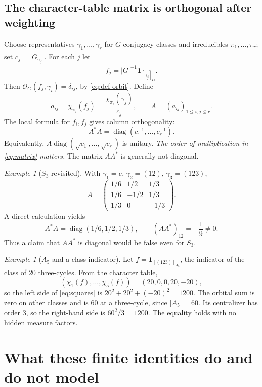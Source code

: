 \documentclass[12pt]{article}
\theoremstyle{remark}
\newtheorem{example}[theorem]{Example}
\newcommand{\Orb}{\mathcal O}
\newcommand{\diag}{\operatorname{diag}}
\begin{document}
\subsection{The character-table matrix is orthogonal after weighting}
Choose representatives $\gamma_1,\ldots,\gamma_r$ for
$G$-conjugacy classes and irreducibles
$\pi_1,\ldots,\pi_r$; set $c_j=|G_{\gamma_j}|$.  For each $j$ let
\begin{equation}\label{eq:basis-orb}
 f_j=|G|^{-1}\mathbf1_{[\gamma_j]_G}.
\end{equation}
Then $\Orb_G(f_j,\gamma_i)=\delta_{ij}$, by
\eqref{eq:def-orbit}. Define
\[
 a_{ij}=\chi_{\pi_i}(f_j)
 =\frac{\chi_{\pi_i}(\gamma_j)}{c_j},\qquad
 A=(a_{ij})_{1\leq i,j\leq r}.
\]
The local formula for $f_i,f_j$ gives column orthogonality:
\begin{equation}\label{eq:matrix}
 \boxed{\displaystyle
 A^*A=\diag(c_1^{-1},\ldots,c_r^{-1}).}
\end{equation}
Equivalently,
$A\diag(\sqrt{c_1},\ldots,\sqrt{c_r})$ is unitary.
\emph{The order of multiplication in \eqref{eq:matrix} matters.}
The matrix $AA^*$ is generally not diagonal.
\begin{example}[$S_3$ revisited]
With $\gamma_1=e$, $\gamma_2=(12)$, $\gamma_3=(123)$,
\[
 A=\begin{pmatrix}
 1/6&1/2&1/3\\
 1/6&-1/2&1/3\\
 1/3&0&-1/3
 \end{pmatrix}.
\]
A direct calculation yields
\[
 A^*A=\diag(1/6,1/2,1/3),\qquad
 (AA^*)_{12}=-\frac19\ne0.
\]
Thus a claim that $AA^*$ is diagonal would be false even for $S_3$.
\end{example}
\begin{example}[$A_5$ and a class indicator]\label{ex:A5}
Let $f=\mathbf1_{[(123)]_{A_5}}$, the indicator of the class of
$20$ three-cycles. From the character table,
\[
 (\chi_1(f),\ldots,\chi_5(f))=(20,0,0,20,-20),
\]
so the left side of \eqref{eq:squares} is
$20^2+20^2+(-20)^2=1200$.  The orbital sum is zero on other
classes and is $60$ at a three-cycle, since $|A_5|=60$.
Its centralizer has order $3$, so the right-hand side is
$60^2/3=1200$.  The equality holds with no hidden measure factors.
\end{example}

\section{What these finite identities do and do not model}
\label{sec:models}
\end{document}
